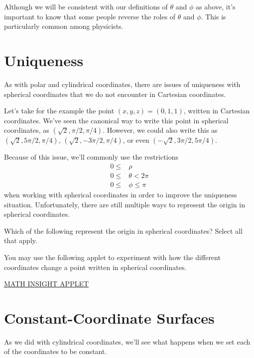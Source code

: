 \documentclass{ximera}
\begin{document}
Although we will be consistent with our definitions of $\theta$ and $\phi$ as above, it's important to know that some people reverse the roles of $\theta$ and $\phi$. This is particularly common among physicists.

\section{Uniqueness}

As with polar and cylindrical coordinates, there are issues of uniqueness with spherical coordinates that we do not encounter in Cartesian coordinates.

Let's take for the example the point $(x,y,z) = (0,1,1)$, written in Cartesian coordinates. We've seen the canonical way to write this point in spherical coordinates, as $(\sqrt{2}, \pi/2, \pi/4)$. However, we could also write this as $(\sqrt{2}, 5\pi/2, \pi/4)$, $(\sqrt{2}, -3\pi/2, \pi/4)$, or even $(-\sqrt{2}, 3\pi/2, 5\pi/4)$.

Because of this issue, we'll commonly use the restrictions
\begin{align*}
0\leq &\rho\\
0\leq &\theta<2\pi\\
0\leq &\phi\leq\pi
\end{align*}
when working with spherical coordinates in order to improve the uniqueness situation. Unfortunately, there are still multiple ways to represent the origin in spherical coordinates.

\begin{problem}
Which of the following represent the origin in spherical coordinates? Select all that apply.
\begin{selectAll}
\end{selectAll}
\end{problem}

You may use the following applet to experiment with how the different coordinates change a point written in spherical coordinates.

\href{https://mathinsight.org/spherical_coordinates}{MATH INSIGHT APPLET}

\section{Constant-Coordinate Surfaces}

As we did with cylindrical coordinates, we'll see what happens when we set each of the coordinates to be constant.
\end{document}
